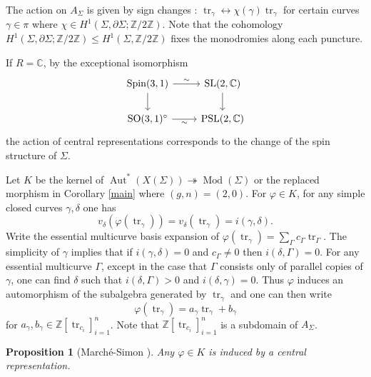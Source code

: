 \documentclass[11pt]{amsart}
\numberwithin{theorem}{section}
\newtheorem{proposition}[theorem]{Proposition}
\theoremstyle{definition}
\theoremstyle{remark}
\newcommand{\C}{{\mathbb{C}}}
\newcommand{\Z}{{\mathbb{Z}}}
\DeclareMathOperator{\Aut}{Aut}
\DeclareMathOperator{\Mod}{Mod}
\DeclareMathOperator{\PSL}{PSL}
\DeclareMathOperator{\SL}{SL}
\DeclareMathOperator{\SO}{SO}
\DeclareMathOperator{\tr}{tr}
\newcommand{\<}{\langle}
\renewcommand{\>}{\rangle}
\begin{document}
The action on $A_\Sigma$ is given by sign changes : $\tr_\gamma \leftrightarrow \chi(\gamma)\tr_\gamma$ for certain curves $\gamma \in \pi$ where $\chi \in H^1(\Sigma, \partial \Sigma ; \Z / 2\Z)$. Note that the cohomology $H^1(\Sigma, \partial \Sigma ; \Z / 2\Z) \leq H^1(\Sigma , \Z / 2\Z)$ fixes the monodromies along each puncture. 

If $R = \C$, by the exceptional isomorphism
\[
\begin{tikzcd}
{\mathrm{Spin}(3,1)} \arrow[d] \arrow[r, "\sim"] & {\SL(2, \C)} \arrow[d] \\
{\SO(3,1)^\circ} \arrow[r, "\sim"']                & {\PSL(2, \C)}         
\end{tikzcd}
\]
the action of central representations corresponds to the change of the spin structure of $\Sigma$.

Let $K$ be the kernel of $\Aut^*(X(\Sigma)) \twoheadrightarrow \Mod(\Sigma)$ or the replaced morphism in Corollary \ref{main} where $(g, n) = (2, 0)$. For $\varphi \in K$, for any simple closed curves $\gamma, \delta$ one has
\[
v_\delta(\varphi(\tr_\gamma)) = v_\delta(\tr_\gamma) = i(\gamma, \delta).
\]
Write the essential multicurve basis expansion of $\varphi(\tr_\gamma) = \sum_\Gamma c_\Gamma \tr_\Gamma$. The simplicity of $\gamma$ implies that if $i(\gamma, \delta) = 0$ and $c_\Gamma \neq 0$ then $i(\delta, \Gamma) = 0$. For any essential multicurve $\Gamma$, except in the case that $\Gamma$ consists only of parallel copies of $\gamma$, one can find $\delta$ such that $i(\delta, \Gamma) > 0$ and $i(\delta, \gamma) = 0$. Thus $\varphi $ induces an automorphism of the subalgebra generated by $\tr_\gamma$ and one can then write
\[
\varphi(\tr_\gamma) = a_\gamma \tr_\gamma + b_\gamma
\]
for $a_\gamma, b_\gamma \in \Z[\tr_{c_i}]_{i=1}^n$. Note that $\Z[\tr_{c_i}]_{i=1}^n$ is a subdomain of $A_\Sigma$.

\begin{proposition}[March\'e-Simon \cite{marche2021automorphisms}]
Any $\varphi \in K$ is induced by a central representation.
\end{proposition}
\end{document}
